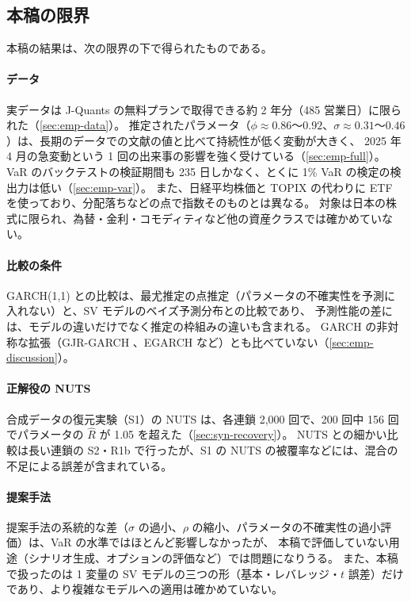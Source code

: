 \subsection{本稿の限界}\label{sec:conc-limitations}

本稿の結果は、次の限界の下で得られたものである。

\paragraph{データ}
実データは J-Quants の無料プランで取得できる約 2 年分（485 営業日）に限られた（\cref{sec:emp-data}）。
推定されたパラメータ（$\phi \approx 0.86$〜$0.92$、$\sigma \approx 0.31$〜$0.46$）は、長期のデータでの文献の値と比べて持続性が低く変動が大きく、
2025 年 4 月の急変動という 1 回の出来事の影響を強く受けている（\cref{sec:emp-full}）。
VaR のバックテストの検証期間も 235 日しかなく、とくに 1\% VaR の検定の検出力は低い（\cref{sec:emp-var}）。
また、日経平均株価と TOPIX の代わりに ETF を使っており、分配落ちなどの点で指数そのものとは異なる。
対象は日本の株式に限られ、為替・金利・コモディティなど他の資産クラスでは確かめていない。

\paragraph{比較の条件}
GARCH(1,1) との比較は、最尤推定の点推定（パラメータの不確実性を予測に入れない）と、SV モデルのベイズ予測分布との比較であり、
予測性能の差には、モデルの違いだけでなく推定の枠組みの違いも含まれる。
GARCH の非対称な拡張（GJR-GARCH \parencite{glosten1993}、EGARCH \parencite{nelson1991}など）とも比べていない（\cref{sec:emp-discussion}）。

\paragraph{正解役の NUTS}
合成データの復元実験（S1）の NUTS は、各連鎖 2,000 回で、200 回中 156 回でパラメータの $\hat R$ が 1.05 を超えた（\cref{sec:syn-recovery}）。
NUTS との細かい比較は長い連鎖の S2・R1b で行ったが、S1 の NUTS の被覆率などには、混合の不足による誤差が含まれている。

\paragraph{提案手法}
提案手法の系統的な差（$\sigma$ の過小、$\rho$ の縮小、パラメータの不確実性の過小評価）は、VaR の水準ではほとんど影響しなかったが、
本稿で評価していない用途（シナリオ生成、オプションの評価など）では問題になりうる。
また、本稿で扱ったのは 1 変量の SV モデルの三つの形（基本・レバレッジ・$t$ 誤差）だけであり、より複雑なモデルへの適用は確かめていない。

